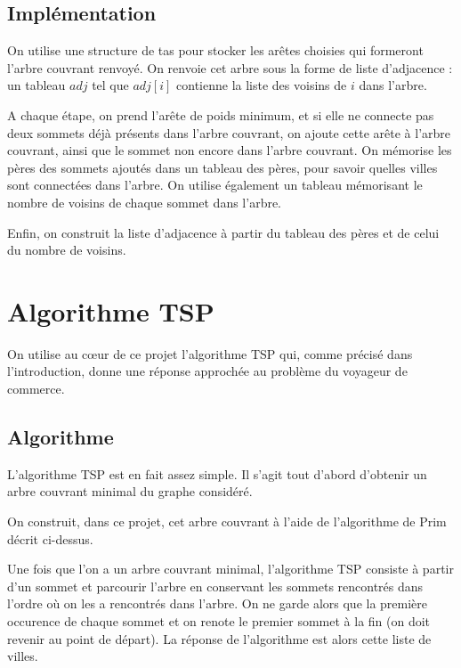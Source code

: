 \documentclass{article}
\begin{document}
\subsection{Implémentation}
On utilise une structure de tas pour stocker les arêtes choisies qui formeront l'arbre couvrant renvoyé. On renvoie cet arbre sous la forme de liste d'adjacence : un tableau $adj$ tel que $adj[i]$ contienne la liste des voisins de $i$ dans l'arbre.

A chaque étape, on prend l'arête de poids minimum, et si elle ne connecte pas deux sommets déjà présents dans l'arbre couvrant, on ajoute cette arête à l'arbre couvrant, ainsi que le sommet non encore dans l'arbre couvrant.
On mémorise les pères des sommets ajoutés dans un tableau des pères, pour savoir quelles villes sont connectées dans l'arbre. On utilise également un tableau mémorisant le nombre de voisins de chaque sommet dans l'arbre.

Enfin, on construit la liste d'adjacence à partir du tableau des pères et de celui du nombre de voisins.


\section{Algorithme TSP}
On utilise au c\oe ur de ce projet l'algorithme TSP qui, comme précisé dans l'introduction, donne une réponse approchée au problème du voyageur de commerce.

\subsection{Algorithme}
L'algorithme TSP est en fait assez simple. Il s'agit tout d'abord d'obtenir un arbre couvrant minimal du graphe considéré.


On construit, dans ce projet, cet arbre couvrant à l'aide de l'algorithme de Prim décrit ci-dessus.

Une fois que l'on a un arbre couvrant minimal, l'algorithme TSP consiste à partir d'un sommet et parcourir l'arbre en conservant les sommets rencontrés dans l'ordre où 
on les a rencontrés dans l'arbre. On ne garde alors que la première occurence de chaque sommet et on renote le premier sommet à la fin (on doit revenir au point de 
départ). La réponse de l'algorithme est alors cette liste de villes.
\end{document}
